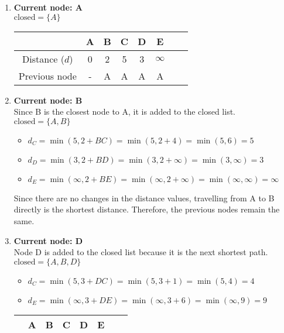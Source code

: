 \begin{enumerate}
    \item \textbf{Current node: A}\\
          $\text{closed} = \{A\}$\\
          \def\arraystretch{1.5}
          \begin{tabular}{ |c|c|c|c|c|c|c|c| }
              \hline
                             & A & B & C & D & E        \\
              \hline
              Distance ($d$) & 0 & 2 & 5 & 3 & $\infty$ \\
              \hline
              Previous node  & - & A & A & A & A        \\
              \hline
          \end{tabular}
    \item \textbf{Current node: B}\\
          Since B is the closest node to A, it is added to the closed list.\\
          $\text{closed} = \{A,B\}$
          \begin{itemize}
              \item $d_C=\min(5,2+BC)=\min(5,2+4)=\min(5,6)=5$
              \item $d_D=\min(3,2+BD)=\min(3,2+\infty)=\min(3,\infty)=3$
              \item $d_E=\min(\infty,2+BE)=\min(\infty,2+\infty)=\min(\infty,\infty)=\infty$
          \end{itemize}
          Since there are no changes in the distance values, travelling from A to B directly is the shortest distance. Therefore, the previous nodes remain the same.
    \item \textbf{Current node: D}\\
          Node D is added to the closed list because it is the next shortest path.\\
          $\text{closed} = \{A,B,D\}$
          \begin{itemize}
              \item $d_C=\min(5,3+DC)=\min(5,3+1)=\min(5,4)=4$
              \item $d_E=\min(\infty,3+DE)=\min(\infty,3+6)=\min(\infty,9)=9$
          \end{itemize}
          \def\arraystretch{1.5}
          \begin{tabular}{ |c|c|c|c|c|c|c|c| }
              \hline
                             & A & B & C & D & E \\
              \hline

\end{tabular}
\end{enumerate}
